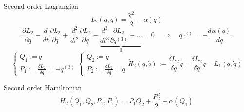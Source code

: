 \documentclass[10pt]{beamer}
\begin{document}
  \begin{frame}{Second order Lagrangian}
    \begin{equation*}
      L_2(q, \ddot{q}) = \frac{\ddot{q}^2}{2} - \alpha(q)
    \end{equation*}
    \vspace{0.2em}
    \begin{equation*} \label{eq: second-order_motion_eq_lagr}
      \frac{\partial L_2}{\partial q} -
      \frac{d}{dt}\frac{\partial L_2}{\partial \dot{q}} +
      \frac{d^2}{dt^2}\frac{\partial L_2}{\partial \ddot{q}} -
      \underbrace{
        \frac{d^3}{dt^3}\frac{\partial L_2}{\partial q^{(3)}} + \ldots
      }_0 = 0
      \quad \Rightarrow \quad
      q^{(4)} = - \frac{d\alpha(q)}{dq}
    \end{equation*}
    \begin{equation*}
      \begin{cases}
        Q_1 := q \\
        P_1 := \frac{\delta L_2}{\delta \dot{q}} = -q^{(3)}
      \end{cases}
      \begin{cases}
        Q_2 := \dot{q} \\
        P_2 := \frac{\delta L_2}{\delta \ddot{q}} = \ddot{q}
      \end{cases}
      \tilde{H}_2(q, \dot{q}) :=
        \frac{\delta L_2}{\delta \dot{q}} \dot{q} +
        \frac{\delta L_2}{\delta \ddot{q}} \ddot{q} -
        L_1(q, \dot{q})
    \end{equation*}
    \begin{block}{Second order Hamiltonian}
      \begin{equation*} \label{eq: second-order_motion_eq_ham}
        H_2(Q_1, Q_2, P_1, P_2) = P_1Q_2 + \frac{P_2^2}{2} + \alpha(Q_1)
      \end{equation*}
    \end{block}
  \end{frame}
\end{document}
